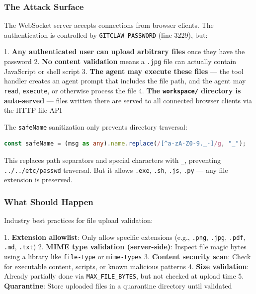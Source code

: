 \subsubsection*{The Attack Surface}

The WebSocket server accepts connections from browser clients. The authentication is controlled by \texttt{GITCLAW\_PASSWORD} (line 3229), but:

1. \textbf{Any authenticated user can upload arbitrary files} once they have the password
2. \textbf{No content validation} means a \texttt{.jpg} file can actually contain JavaScript or shell script
3. \textbf{The agent may execute these files} — the tool handler creates an agent prompt that includes the file path, and the agent may \texttt{read}, \texttt{execute}, or otherwise process the file
4. \textbf{The \texttt{workspace/} directory is auto-served} — files written there are served to all connected browser clients via the HTTP file API

The \texttt{safeName} sanitization only prevents directory traversal:


\begin{lstlisting}[language=TypeScript]
const safeName = (msg as any).name.replace(/[^a-zA-Z0-9._-]/g, "_");

\end{lstlisting}



This replaces path separators and special characters with \texttt{\_}, preventing \texttt{../../etc/passwd} traversal. But it allows \texttt{.exe}, \texttt{.sh}, \texttt{.js}, \texttt{.py} — any file extension is preserved.

\subsubsection*{What Should Happen}

Industry best practices for file upload validation:

1. \textbf{Extension allowlist}: Only allow specific extensions (e.g., \texttt{.png}, \texttt{.jpg}, \texttt{.pdf}, \texttt{.md}, \texttt{.txt})
2. \textbf{MIME type validation (server-side)}: Inspect file magic bytes using a library like \texttt{file-type} or \texttt{mime-types}
3. \textbf{Content security scan}: Check for executable content, scripts, or known malicious patterns
4. \textbf{Size validation}: Already partially done via \texttt{MAX\_FILE\_BYTES}, but not checked at upload time
5. \textbf{Quarantine}: Store uploaded files in a quarantine directory until validated


